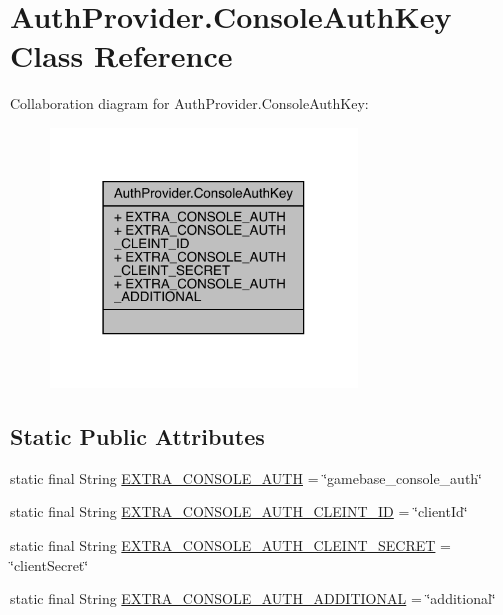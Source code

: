 \hypertarget{classcom_1_1toast_1_1android_1_1gamebase_1_1base_1_1auth_1_1_auth_provider_1_1_console_auth_key}{}\section{Auth\+Provider.\+Console\+Auth\+Key Class Reference}
\label{classcom_1_1toast_1_1android_1_1gamebase_1_1base_1_1auth_1_1_auth_provider_1_1_console_auth_key}


Collaboration diagram for Auth\+Provider.\+Console\+Auth\+Key\+:\nopagebreak
\begin{figure}[H]
\begin{center}
\leavevmode
\includegraphics[width=231pt]{classcom_1_1toast_1_1android_1_1gamebase_1_1base_1_1auth_1_1_auth_provider_1_1_console_auth_key__coll__graph}
\end{center}
\end{figure}
\subsection*{Static Public Attributes}
\begin{DoxyCompactItemize}
\item 
static final String \hyperlink{classcom_1_1toast_1_1android_1_1gamebase_1_1base_1_1auth_1_1_auth_provider_1_1_console_auth_key_a6d4fa95b4de735ccf17abe6fde70d259}{E\+X\+T\+R\+A\+\_\+\+C\+O\+N\+S\+O\+L\+E\+\_\+\+A\+U\+TH} = \char`\"{}gamebase\+\_\+console\+\_\+auth\char`\"{}
\item 
static final String \hyperlink{classcom_1_1toast_1_1android_1_1gamebase_1_1base_1_1auth_1_1_auth_provider_1_1_console_auth_key_ac6bcf3db68724dcc9d2cc3cfda94ad8a}{E\+X\+T\+R\+A\+\_\+\+C\+O\+N\+S\+O\+L\+E\+\_\+\+A\+U\+T\+H\+\_\+\+C\+L\+E\+I\+N\+T\+\_\+\+ID} = \char`\"{}client\+Id\char`\"{}
\item 
static final String \hyperlink{classcom_1_1toast_1_1android_1_1gamebase_1_1base_1_1auth_1_1_auth_provider_1_1_console_auth_key_a3f4e31aeb17f64bacdbe1bbbfcc34868}{E\+X\+T\+R\+A\+\_\+\+C\+O\+N\+S\+O\+L\+E\+\_\+\+A\+U\+T\+H\+\_\+\+C\+L\+E\+I\+N\+T\+\_\+\+S\+E\+C\+R\+ET} = \char`\"{}client\+Secret\char`\"{}
\item 
static final String \hyperlink{classcom_1_1toast_1_1android_1_1gamebase_1_1base_1_1auth_1_1_auth_provider_1_1_console_auth_key_aa1a96e6377b38abb4c75c09b4a633c58}{E\+X\+T\+R\+A\+\_\+\+C\+O\+N\+S\+O\+L\+E\+\_\+\+A\+U\+T\+H\+\_\+\+A\+D\+D\+I\+T\+I\+O\+N\+AL} = \char`\"{}additional\char`\"{}
\end{DoxyCompactItemize}


